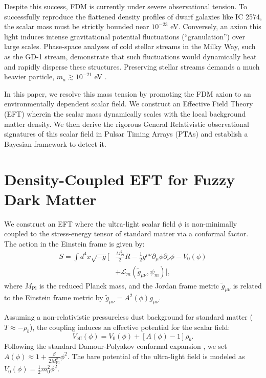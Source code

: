 \documentclass[aps,prd,twocolumn,nofootinbib,superscriptaddress,10pt]{revtex4-2}
\begin{document}
Despite this success, FDM is currently under severe observational tension. To successfully reproduce the flattened density profiles of dwarf galaxies like IC 2574, the scalar mass must be strictly bounded near $10^{-23}$ eV. Conversely, an axion this light induces intense gravitational potential fluctuations (``granulation'') over large scales. Phase-space analyses of cold stellar streams in the Milky Way, such as the GD-1 stream, demonstrate that such fluctuations would dynamically heat and rapidly disperse these structures. Preserving stellar streams demands a much heavier particle, $m_a \gtrsim 10^{-21}$ eV \cite{Dalal2022}.

In this paper, we resolve this mass tension by promoting the FDM axion to an environmentally dependent scalar field. We construct an Effective Field Theory (EFT) wherein the scalar mass dynamically scales with the local background matter density. We then derive the rigorous General Relativistic observational signatures of this scalar field in Pulsar Timing Arrays (PTAs) and establish a Bayesian framework to detect it.

\section{Density-Coupled EFT for Fuzzy Dark Matter}

We construct an EFT where the ultra-light scalar field $\phi$ is non-minimally coupled to the stress-energy tensor of standard matter via a conformal factor. The action in the Einstein frame is given by:
\begin{align}
    S = \int d^4x \sqrt{-g} \bigg[ &\frac{M_{\text{Pl}}^2}{2}R - \frac{1}{2}g^{\mu\nu}\partial_\mu \phi \partial_\nu \phi - V_0(\phi) \nonumber \\
    &+ \mathcal{L}_m(\tilde{g}_{\mu\nu}, \psi_m) \bigg],
\end{align}
where $M_{\text{Pl}}$ is the reduced Planck mass, and the Jordan frame metric $\tilde{g}_{\mu\nu}$ is related to the Einstein frame metric by $\tilde{g}_{\mu\nu} = A^2(\phi)g_{\mu\nu}$. 

Assuming a non-relativistic pressureless dust background for standard matter ($T \approx -\rho_b$), the coupling induces an effective potential for the scalar field:
\begin{equation}
    V_{\text{eff}}(\phi) = V_0(\phi) + [A(\phi) - 1]\rho_b.
\end{equation}
Following the standard Damour-Polyakov conformal expansion \cite{Damour1994}, we set $A(\phi) \approx 1 + \frac{\beta}{2 M_{\text{Pl}}^2} \phi^2$. The bare potential of the ultra-light field is modeled as $V_0(\phi) = \frac{1}{2}m_0^2 \phi^2$.
\end{document}
